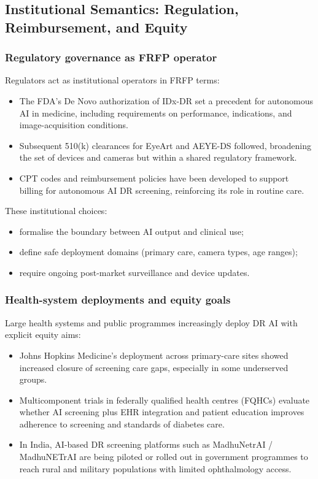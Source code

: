 \subsection{Institutional Semantics:
  Regulation, Reimbursement, and Equity}

\subsubsection*{Regulatory governance as FRFP operator}

Regulators act as institutional operators in FRFP terms:

\begin{itemize}
  \item The FDA’s De Novo authorization of IDx-DR set a precedent for
        autonomous AI in medicine, including requirements on performance,
        indications, and image-acquisition conditions.
  \item Subsequent 510(k) clearances for EyeArt and AEYE-DS followed,
        broadening the set of devices and cameras but within a shared
        regulatory framework.
  \item CPT codes and reimbursement policies have been developed to support
        billing for autonomous AI DR screening, reinforcing its role in
        routine care.
\end{itemize}

These institutional choices:

\begin{itemize}
  \item formalise the boundary between AI output and clinical use;
  \item define safe deployment domains (primary care, camera types,
        age ranges);
  \item require ongoing post-market surveillance and device updates.
\end{itemize}

\subsubsection*{Health-system deployments and equity goals}

Large health systems and public programmes increasingly deploy DR AI with
explicit equity aims:

\begin{itemize}
  \item Johns Hopkins Medicine’s deployment across primary-care sites showed
        increased closure of screening care gaps, especially in some
        underserved groups.
  \item Multicomponent trials in federally qualified health centres
        (FQHCs) evaluate whether AI screening plus EHR integration and
        patient education improves adherence to screening and standards of
        diabetes care.
  \item In India, AI-based DR screening platforms such as MadhuNetrAI /
        MadhuNETrAI are being piloted or rolled out in government
        programmes to reach rural and military populations with limited
        ophthalmology access.
\end{itemize}

